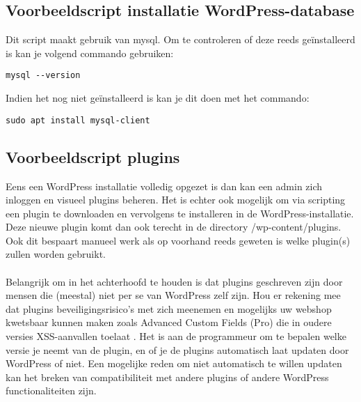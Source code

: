 \subsection{Voorbeeldscript installatie WordPress-database}
Dit script maakt gebruik van mysql. Om te controleren of deze reeds geïnstalleerd is kan je volgend commando gebruiken:
\begin{verbatim}
mysql --version 
\end{verbatim}
Indien het nog niet geïnstalleerd is kan je dit doen met het commando:
\begin{verbatim}
sudo apt install mysql-client
\end{verbatim}
\subsection{Voorbeeldscript plugins}
Eens een WordPress installatie volledig opgezet is dan kan een admin zich inloggen en visueel plugins beheren. Het is echter ook mogelijk om via scripting een plugin te downloaden en vervolgens te installeren in de WordPress-installatie. Deze nieuwe plugin komt dan ook terecht in de directory /wp-content/plugins. Ook dit bespaart manueel werk als op voorhand reeds geweten is welke plugin(s) zullen worden gebruikt.
\\\\
Belangrijk om in het achterhoofd te houden is dat plugins geschreven zijn door mensen die (meestal) niet per se van WordPress zelf zijn. Hou er rekening mee dat plugins beveiligingsrisico's met zich meenemen en mogelijks uw webshop kwetsbaar kunnen maken zoals Advanced Custom Fields (Pro) die in oudere versies XSS-aanvallen toelaat \autocite{Leemputten2023}. Het is aan de programmeur om te bepalen welke versie je neemt van de plugin, en of je de plugins automatisch laat updaten door WordPress of niet. Een mogelijke reden om niet automatisch te willen updaten kan het breken van compatibiliteit met andere plugins of andere WordPress functionaliteiten zijn.


